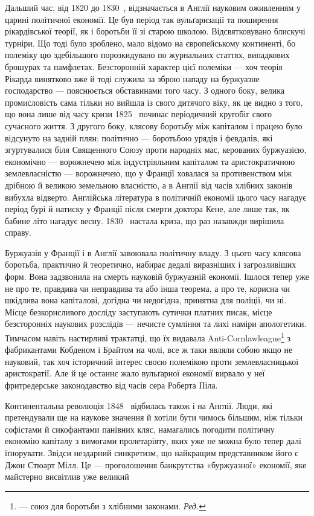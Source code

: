 
Дальший час, від 1820 до 1830~, відзначається в Англії науковим
оживленням у царині політичної економії. Це був період
так вульґаризації та поширення рікардівської теорії, як і боротьби
її зі старою школою. Відсвятковувано блискучі турніри.
Що тоді було зроблено, мало відомо на європейському континенті,
бо полеміку цю здебільшого порозкидувано по журнальних
статтях, випадкових брошурах та памфлетах. Безсторонній характер
цієї полеміки — хоч теорія Рікарда винятково вже й тоді
служила за зброю нападу на буржуазне господарство — пояснюється
обставинами того часу. З одного боку, велика промисловість
сама тільки но вийшла із свого дитячого віку, як це видно з того,
що вона лише від часу кризи 1825~ починає періодичний кругобіг
свого сучасного життя. З другого боку, клясову боротьбу між
капіталом і працею було відсунуто на задній плян: політично —
боротьбою урядів і февдалів, які згуртувалися біля Священного
Союзу проти народніх мас, керованих буржуазією, економічно —
ворожнечею між індустріяльним капіталом та аристократичною
землевласністю — ворожнечею, що у Франції ховалася за противенством
між дрібною й великою земельною власністю, а в Англії
від часів хлібних законів вибухла відверто. Англійська література
в політичній економії цього часу нагадує період бурі й натиску
у Франції після смерти доктора Кене, але лише так, як
бабине літо нагадує весну. 1830~ настала криза, що раз назавжди
вирішила справу.

Буржуазія у Франції і в Англії завоювала політичну владу.
З цього часу клясова боротьба, практично й теоретично, набирає
дедалі виразніших і загрозливіших форм. Вона задзвонила
на смерть науковій буржуазній економії. Ішлося тепер уже
не про те, правдива чи неправдива та або інша теорема, а про те,
корисна чи шкідлива вона капіталові, догідна чи недогідна, принятна
для поліції, чи ні. Місце безкорисливого досліду заступають
сутички платних писак, місце безсторонніх наукових розслідів —
нечисте сумління та лихі наміри апологетики. Тимчасом навіть
настирливі трактатці, що їх видавала Anti-Cornlawleague\footnote*{
— союз для боротьби з хлібними законами. \emph{Ред.}
} з
фабрикантами Кобденом і Брайтом на чолі, все ж таки являли
собою якщо не науковий, так хоч історичний інтерес своєю полемікою
проти землевласницької аристократії. Але й це останнє
жало вульґарної економії вирвало у неї фритредерське законодавство
від часів сера Роберта Піла.

Континентальна революція 1848~ відбилась також і на Англії.
Люди, які претендували ще на наукове значення й хотіли бути
чимось більшим, ніж тільки софістами й сикофантами панівних
кляс, намагались погодити політичну економію капіталу з вимогами
пролетаріяту, яких уже не можна було тепер далі іґнорувати.
Звідси нездарний синкретизм, що найкращим представником
його є Джон Стюарт Мілл. Це — проголошення банкрутства
«буржуазної» економії, яке майстерно висвітлив уже великий
\parbreak{}  %
